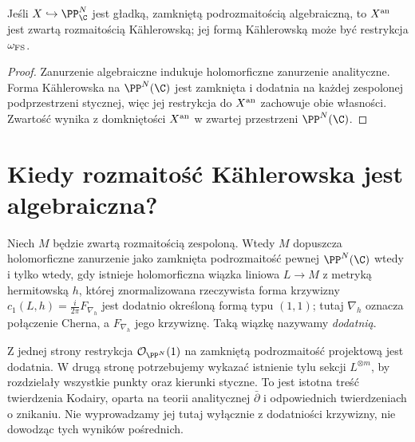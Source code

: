 \begin{wniosek}
Jeśli $X\hookrightarrow\PP^N_\C$ jest gładką, zamkniętą
podrozmaitością algebraiczną, to $X^{\rm an}$ jest
zwartą rozmaitością Kählerowską; jej formą
Kählerowską może być restrykcja $\omega_{\rm FS}$.
\end{wniosek}
\begin{proof}
Zanurzenie algebraiczne indukuje holomorficzne
zanurzenie analityczne. Forma Kählerowska na
$\PP^N(\C)$ jest zamknięta i dodatnia na
każdej zespolonej podprzestrzeni stycznej, więc
jej restrykcja do $X^{\rm an}$ zachowuje obie własności.
Zwartość wynika z domkniętości $X^{\rm an}$
w zwartej przestrzeni $\PP^N(\C)$.
\end{proof}

\section{Kiedy rozmaitość Kählerowska jest algebraiczna?}
\label{sec:ga9-kodaira}

\begin{twierdzenie}
\label{tw:ga9-kodaira}
Niech $M$ będzie zwartą rozmaitością zespoloną.
Wtedy $M$ dopuszcza holomorficzne zanurzenie jako
zamknięta podrozmaitość pewnej $\PP^N(\C)$ wtedy
i tylko wtedy, gdy istnieje holomorficzna wiązka
liniowa $L\to M$ z metryką hermitowską $h$,
której znormalizowana rzeczywista forma krzywizny
$c_1(L,h)=\frac{i}{2\pi}F_{\nabla_h}$ jest dodatnio
określoną formą typu $(1,1)$; tutaj $\nabla_h$ oznacza
połączenie Cherna, a $F_{\nabla_h}$ jego krzywiznę.
Taką wiązkę nazywamy \emph{dodatnią}.
\end{twierdzenie}

\begin{uwaga}
Z jednej strony restrykcja $\mathcal O_{\PP^N}(1)$
na zamkniętą podrozmaitość projektową jest dodatnia.
W drugą stronę potrzebujemy wykazać istnienie tylu
sekcji $L^{\otimes m}$, by rozdzielały wszystkie
punkty oraz kierunki styczne. To jest istotna treść
twierdzenia Kodairy, oparta na teorii analitycznej
$\bar\partial$ i odpowiednich twierdzeniach o znikaniu.
Nie wyprowadzamy jej tutaj wyłącznie z dodatniości
krzywizny, nie dowodząc tych wyników pośrednich.
\end{uwaga}

